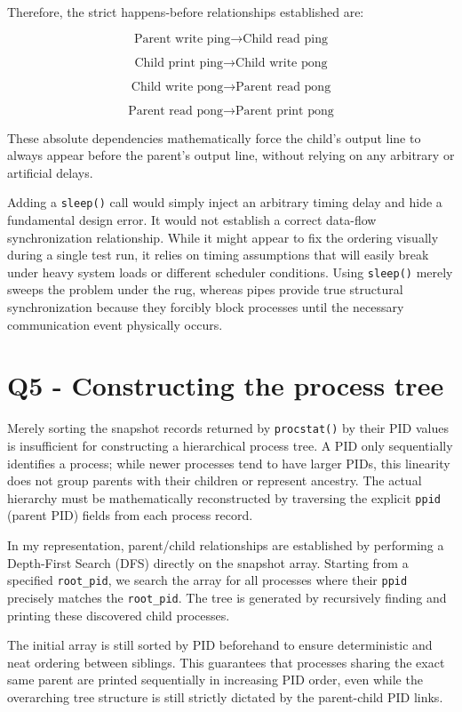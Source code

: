 \documentclass[11pt,a4paper]{article}
\begin{document}
Therefore, the strict happens-before relationships established are:

\[
\text{Parent write ping} \rightarrow \text{Child read ping}
\]

\[
\text{Child print ping} \rightarrow \text{Child write pong}
\]

\[
\text{Child write pong} \rightarrow \text{Parent read pong}
\]

\[
\text{Parent read pong} \rightarrow \text{Parent print pong}
\]

These absolute dependencies mathematically force the child's output line to always appear before the parent's output line, without relying on any arbitrary or artificial delays.

Adding a \texttt{sleep()} call would simply inject an arbitrary timing delay and hide a fundamental design error. It would not establish a correct data-flow synchronization relationship. While it might appear to fix the ordering visually during a single test run, it relies on timing assumptions that will easily break under heavy system loads or different scheduler conditions. Using \texttt{sleep()} merely sweeps the problem under the rug, whereas pipes provide true structural synchronization because they forcibly block processes until the necessary communication event physically occurs.

\section*{Q5 - Constructing the process tree}

Merely sorting the snapshot records returned by \texttt{procstat()} by their PID values is insufficient for constructing a hierarchical process tree. A PID only sequentially identifies a process; while newer processes tend to have larger PIDs, this linearity does not group parents with their children or represent ancestry. The actual hierarchy must be mathematically reconstructed by traversing the explicit \texttt{ppid} (parent PID) fields from each process record.

In my representation, parent/child relationships are established by performing a Depth-First Search (DFS) directly on the snapshot array. Starting from a specified \texttt{root\_pid}, we search the array for all processes where their \texttt{ppid} precisely matches the \texttt{root\_pid}. The tree is generated by recursively finding and printing these discovered child processes.

The initial array is still sorted by PID beforehand to ensure deterministic and neat ordering between siblings. This guarantees that processes sharing the exact same parent are printed sequentially in increasing PID order, even while the overarching tree structure is still strictly dictated by the parent-child PID links.
\end{document}
